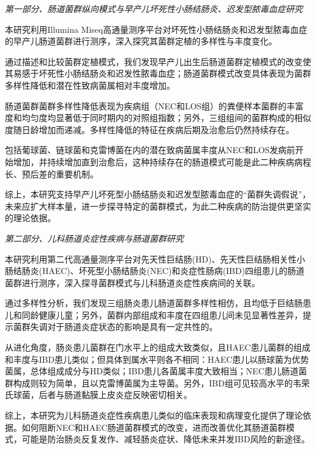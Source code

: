 
\begin{summary}
\textit{第一部分、肠道菌群纵向模式与早产儿坏死性小肠结肠炎、迟发型脓毒血症研究}

  本研究利用Illumina Miseq高通量测序平台对坏死性小肠结肠炎和迟发型脓毒血症的早产儿肠道菌群进行测序，深入探究其菌群定植的多样性与丰度变化。

  通过描述和比较菌群定植模式，我们发现早产儿出生后肠道菌群定植模式的改变使其易感于坏死性小肠结肠炎和迟发性脓毒血症；肠道菌群模式改变具体表现为菌群多样性降低和潜在性致病菌属相对丰度增加。

  肠道菌群菌群多样性降低表现为疾病组（NEC和LOS组）的粪便样本菌群的丰富度和均匀度均显著低于同时期内的对照组指数；另外，三组组间的菌群构成的相似度随日龄增加而递减。多样性降低的特征在疾病后期及治愈后仍然持续存在。

  包括葡球菌、链球菌和克雷博菌在内的潜在致病菌属丰度从NEC和LOS发病前开始增加，并持续增加直到治愈后，这种持续存在的肠道模式可能是此二种疾病病程长、预后差的重要机制。

  综上，本研究支持早产儿坏死型小肠结肠炎和迟发型脓毒血症的“菌群失调假说”，未来应扩大样本量，进一步探寻特定的菌群模式，为此二种疾病的防治提供更坚实的理论依据。

\textit{第二部分、儿科肠道炎症性疾病与肠道菌群研究}

  本研究利用第二代高通量测序平台对先天性巨结肠(HD)、先天性巨结肠相关性小肠结肠炎(HAEC)、坏死型小肠结肠炎(NEC)和炎症性肠病(IBD)四组患儿的肠道菌群进行测序，深入探寻菌群模式与儿科肠道炎症性疾病间的关联。

  通过多样性分析，我们发现三组肠炎患儿肠道菌群多样性相仿，且均低于巨结肠患儿和同龄健康儿童；另外，菌群内部组成和丰度在四组患儿间未见显著性差异，提示菌群失调对于肠道炎症状态的影响是具有一定共性的。

  从进化角度，肠炎患儿菌群在门水平上的组成大致类似，且HAEC患儿菌群的组成和丰度与IBD患儿类似；但具体到属水平则各不相同：HAEC患儿以肠球菌为优势菌属，总体组成成分与HD类似；IBD患儿各菌属丰度大致相当；NEC患儿肠道菌群构成则较为简单，且以克雷博菌属为主导菌。另外，IBD组可见较高水平的韦荣氏球菌，后者与肠道黏膜上皮炎症反映密切相关。

  综上，本研究为儿科肠道炎症性疾病患儿类似的临床表现和病理变化提供了理论依据。如何阻断NEC和HAEC肠道菌群模式的改变，进而改善优化其肠道菌群模式，可能是防治肠炎反复发作、减轻肠炎症状、降低未来并发IBD风险的新途径。

\end{summary}
